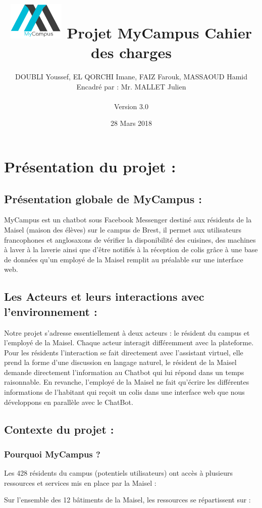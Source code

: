 \documentclass[12pt]{report}
\title{
\includegraphics[width=0.2\textwidth]{logo.png}
\linebreak Projet MyCampus \linebreak Cahier des charges
}
\author{DOUBLI Youssef, EL QORCHI Imane, FAIZ Farouk, MASSAOUD Hamid 
\\
Encadré par : Mr. MALLET Julien
\\
\\
Version 3.0 
}
\date{28 Mars 2018}
\begin{document}
\maketitle
\setcounter{secnumdepth}{3}
\setcounter{tocdepth}{3}
\tableofcontents
\newpage
\section{Présentation du projet : }
\subsection{Présentation globale de MyCampus :}
MyCampus est un chatbot sous Facebook Messenger destiné aux résidents de la Maisel (maison des élèves) sur le campus de Brest, il permet aux utilisateurs francophones et anglosaxons de vérifier la disponibilité des cuisines, des machines à laver à la laverie ainsi que d’être notifiés à la réception de colis grâce à une base de données qu’un employé de la Maisel remplit au préalable sur une interface web.
\subsection{Les Acteurs et leurs interactions avec l’environnement :}

Notre projet s'adresse essentiellement à deux acteurs : le résident du campus et l'employé de la Maisel.  Chaque acteur interagit différemment avec la plateforme. Pour les résidents l’interaction se fait directement avec l’assistant virtuel, elle prend la forme d’une discussion en langage naturel, le résident de la Maisel demande directement l’information au Chatbot qui lui répond dans un temps raisonnable.
En revanche, l’employé  de la Maisel ne fait qu’écrire les différentes informations de l’habitant qui reçoit un colis dans une interface web que nous développons en parallèle avec le ChatBot. 


\subsection{Contexte du projet :}
\subsubsection{Pourquoi MyCampus ?}
Les 428 résidents du campus (potentiels utilisateurs) ont accès à plusieurs ressources et services mis en place par la Maisel :

Sur l’ensemble des 12 bâtiments de la Maisel, les ressources se répartissent sur :
\end{document}
